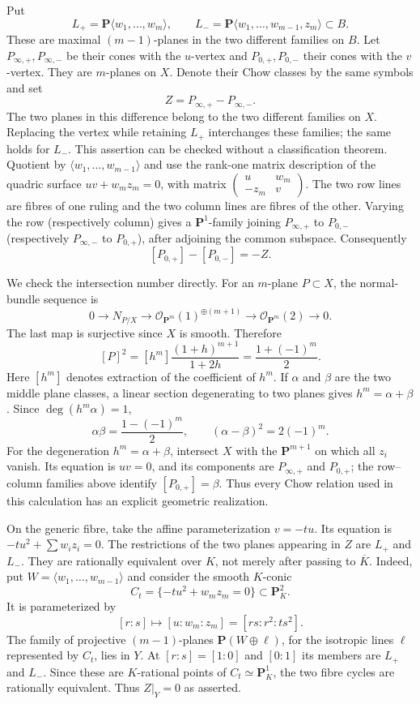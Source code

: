 Put
\[
 L_+=\mathbf P\langle w_1,\ldots,w_m\rangle,\qquad
 L_-=\mathbf P\langle w_1,\ldots,w_{m-1},z_m\rangle
       \subset B.
\]
These are maximal $(m-1)$-planes in the two different families on $B$.
Let $P_{\infty,+},P_{\infty,-}$ be their cones with the $u$-vertex and
$P_{0,+},P_{0,-}$ their cones with the $v$-vertex. They are $m$-planes on
$X$. Denote their Chow classes by the same symbols and set
\[
 Z=P_{\infty,+}-P_{\infty,-}.
\]
The two planes in this difference belong to the two different families on
$X$. Replacing the vertex while retaining $L_+$ interchanges these families;
the same holds for $L_-$. This assertion can be checked without a
classification theorem. Quotient by
$\langle w_1,\ldots,w_{m-1}\rangle$ and use the rank-one matrix description
of the quadric surface $uv+w_mz_m=0$, with matrix
$\left(\begin{smallmatrix}u&w_m\\-z_m&v\end{smallmatrix}\right)$.
The two row lines are fibres of one ruling and the two column lines are
fibres of the other. Varying the row (respectively column) gives a
$\mathbf P^1$-family joining $P_{\infty,+}$ to $P_{0,-}$ (respectively
$P_{\infty,-}$ to $P_{0,+}$), after adjoining the common subspace.
Consequently
\[
 [P_{0,+}]-[P_{0,-}]=-Z.
\]

We check the intersection number directly. For an $m$-plane $P\subset X$,
the normal-bundle sequence is
\[
 0\longrightarrow N_{P/X}\longrightarrow
 \mathcal O_{\mathbf P^m}(1)^{\oplus(m+1)}
 \longrightarrow\mathcal O_{\mathbf P^m}(2)\longrightarrow0.
\]
The last map is surjective since $X$ is smooth. Therefore
\[
 [P]^2=[h^m]\frac{(1+h)^{m+1}}{1+2h}
       =\frac{1+(-1)^m}{2}.
\]
Here $[h^m]$ denotes extraction of the coefficient of $h^m$. If $\alpha$
and $\beta$ are the two middle plane classes, a linear section degenerating
to two planes gives $h^m=\alpha+\beta$. Since $\deg(h^m\alpha)=1$,
\[
 \alpha\beta=\frac{1-(-1)^m}{2},\qquad
 (\alpha-\beta)^2=2(-1)^m.
\]
For the degeneration $h^m=\alpha+\beta$, intersect $X$ with the
$\mathbf P^{m+1}$ on which all $z_i$ vanish. Its equation is $uv=0$, and
its components are $P_{\infty,+}$ and $P_{0,+}$; the row--column families
above identify $[P_{0,+}]=\beta$. Thus every Chow relation used in this
calculation has an explicit geometric realization.

On the generic fibre, take the affine parameterization $v=-t u$. Its
equation is $-t u^2+\sum w_i z_i=0$. The restrictions of the two planes
appearing in $Z$ are $L_+$ and $L_-$. They are rationally equivalent over
$K$, not merely after passing to $\overline K$. Indeed, put
$W=\langle w_1,\ldots,w_{m-1}\rangle$ and consider the smooth $K$-conic
\[
 C_t=\{-t u^2+w_mz_m=0\}\subset\mathbf P^2_K.
\]
It is parameterized by
\[
 [r:s]\longmapsto[u:w_m:z_m]=[rs:r^2:t s^2].
\]
The family of projective $(m-1)$-planes
$\mathbf P(W\oplus\ell)$, for the isotropic lines $\ell$ represented by
$C_t$, lies in $Y$. At $[r:s]=[1:0]$ and $[0:1]$ its members are $L_+$
and $L_-$. Since these are $K$-rational points of $C_t\simeq\mathbf P^1_K$,
the two fibre cycles are rationally equivalent. Thus $Z|_Y=0$ as asserted.

